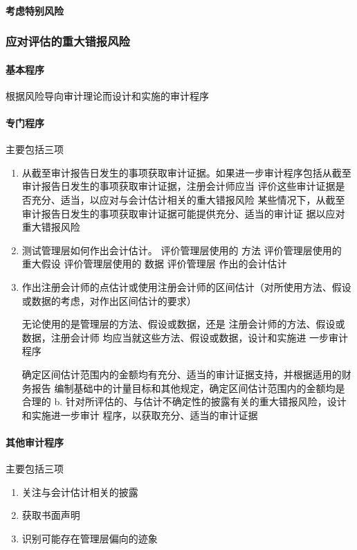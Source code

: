 \documentclass[UTF8,12pt]{ctexart}
\numberwithin{equation}{section} %
\numberwithin{figure}{section}
\numberwithin{table}{section}
\begin{document}
	\paragraph{考虑特别风险}
	
	\subsubsection{应对评估的重大错报风险}
	\paragraph{基本程序}
	根据风险导向审计理论而设计和实施的审计程序
	
	\paragraph{专门程序}主要包括三项
	\begin{enumerate}
		\item 从截至审计报告日发生的事项获取审计证据。如果进一步审计程序包括从截至审计报告日发生的事项获取审计证据，注册会计师应当
		评价这些审计证据是否充分、适当，以应对与会计估计相关的重大错报风险
		某些情况下，从截至审计报告日发生的事项获取审计证据可能提供充分、适当的审计证
		据以应对重大错报风险
		
		\item 测试管理层如何作出会计估计。
		评价管理层使用的  方法
		评价管理层使用的  重大假设
		评价管理层使用的  数据
		评价管理层  作出的会计估计
		
		\item 作出注册会计师的点估计或使用注册会计师的区间估计（对所使用方法、假设或数据的考虑，对作出区间估计的要求）
		
		无论使用的是管理层的方法、假设或数据，还是
		注册会计师的方法、假设或数据，注册会计师
		均应当就这些方法、假设或数据，设计和实施进 一步审计程序
		
		确定区间估计范围内的金额均有充分、适当的审计证据支持，并根据适用的财务报告
		编制基础中的计量目标和其他规定，确定区间估计范围内的金额均是合理的 b.  针对所评估的、与估计不确定性的披露有关的重大错报风险，设计和实施进一步审计
		程序，以获取充分、适当的审计证据
	\end{enumerate}
	
	\paragraph{其他审计程序}主要包括三项
	\begin{enumerate}
		\item 关注与会计估计相关的披露
		
		\item 获取书面声明
		
		\item 识别可能存在管理层偏向的迹象
	\end{enumerate}
	
\end{document}
